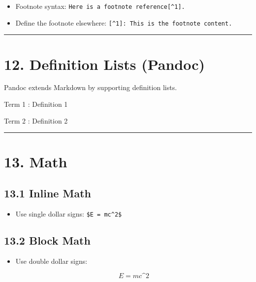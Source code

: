 \documentclass[
]{book}
\newenvironment{Shaded}{\begin{snugshade}}{\end{snugshade}}
\newcommand{\NormalTok}[1]{#1}
\providecommand{\tightlist}{%
  \setlength{\itemsep}{0pt}\setlength{\parskip}{0pt}}
\theoremstyle{definition}
\theoremstyle{definition}
\theoremstyle{definition}
\theoremstyle{definition}
\theoremstyle{remark}
\begin{document}
\begin{itemize}
\tightlist
\item
  Footnote syntax: \texttt{Here\ is\ a\ footnote\ reference{[}\^{}1{]}.}
\item
  Define the footnote elsewhere: \texttt{{[}\^{}1{]}:\ This\ is\ the\ footnote\ content.}
\end{itemize}

\begin{center}\rule{0.5\linewidth}{0.5pt}\end{center}

\section{12. Definition Lists (Pandoc)}\label{definition-lists-pandoc}

Pandoc extends Markdown by supporting definition lists.

\begin{Shaded}
\begin{Highlighting}[]
\NormalTok{Term 1}
\NormalTok{: Definition 1}

\NormalTok{Term 2}
\NormalTok{: Definition 2}
\end{Highlighting}
\end{Shaded}

\begin{center}\rule{0.5\linewidth}{0.5pt}\end{center}

\section{13. Math}\label{math}

\subsection{13.1 Inline Math}\label{inline-math}

\begin{itemize}
\tightlist
\item
  Use single dollar signs: \texttt{\$E\ =\ mc\^{}2\$}
\end{itemize}

\subsection{13.2 Block Math}\label{block-math}

\begin{itemize}
\item
  Use double dollar signs:

\begin{Shaded}
\begin{Highlighting}[]
\NormalTok{$$ }
\NormalTok{E = mc\^{}2 }
\NormalTok{$$}
\end{Highlighting}
\end{Shaded}
\end{itemize}
\end{document}
